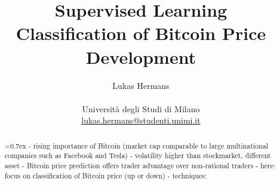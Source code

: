 \title{\large Supervised Learning \\ \LARGE
 Classification of Bitcoin Price Development}
\author{Lukas Hermans\\ \\
{Università degli Studi di Milano} \\
\href{mailto:lukas.hermans@studenti.unimi.it}
{lukas.hermans@studenti.unimi.it}}

\maketitle

\begin{abstract} 
\noindent
{}\font=0.7ex%
- rising importance of Bitcoin (market cap comparable to large multinational companies such as Facebook and Tesla)
- volatility higher than stockmarket, different asset
- Bitcoin price prediction offers trader advantage over non-rational traders
- here: focus on classification of Bitcoin price (up or down)
- techniques: 
\end{abstract}
